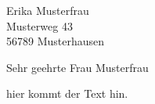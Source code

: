 \documentclass[%
  fontsize=12pt, %
]{scrlttr2}
\begin{document}
\begin{letter}{%
  Erika Musterfrau\\
  Musterweg 43\\
  56789 Musterhausen%
}



\opening{Sehr geehrte Frau Musterfrau}

hier kommt der Text hin.




\end{letter}
\end{document}
